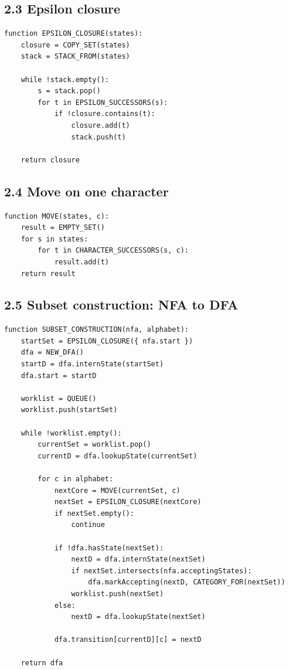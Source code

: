 \documentclass[10pt,letterpaper]{article}
\begin{document}
\subsection*{2.3 Epsilon closure}
{}

\begin{verbatim}
function EPSILON_CLOSURE(states):
    closure = COPY_SET(states)
    stack = STACK_FROM(states)

    while !stack.empty():
        s = stack.pop()
        for t in EPSILON_SUCCESSORS(s):
            if !closure.contains(t):
                closure.add(t)
                stack.push(t)

    return closure
\end{verbatim}

\subsection*{2.4 Move on one character}
{}

\begin{verbatim}
function MOVE(states, c):
    result = EMPTY_SET()
    for s in states:
        for t in CHARACTER_SUCCESSORS(s, c):
            result.add(t)
    return result
\end{verbatim}

\subsection*{2.5 Subset construction: NFA to DFA}
{}

\begin{verbatim}
function SUBSET_CONSTRUCTION(nfa, alphabet):
    startSet = EPSILON_CLOSURE({ nfa.start })
    dfa = NEW_DFA()
    startD = dfa.internState(startSet)
    dfa.start = startD

    worklist = QUEUE()
    worklist.push(startSet)

    while !worklist.empty():
        currentSet = worklist.pop()
        currentD = dfa.lookupState(currentSet)

        for c in alphabet:
            nextCore = MOVE(currentSet, c)
            nextSet = EPSILON_CLOSURE(nextCore)
            if nextSet.empty():
                continue

            if !dfa.hasState(nextSet):
                nextD = dfa.internState(nextSet)
                if nextSet.intersects(nfa.acceptingStates):
                    dfa.markAccepting(nextD, CATEGORY_FOR(nextSet))
                worklist.push(nextSet)
            else:
                nextD = dfa.lookupState(nextSet)

            dfa.transition[currentD][c] = nextD

    return dfa
\end{verbatim}
\end{document}
